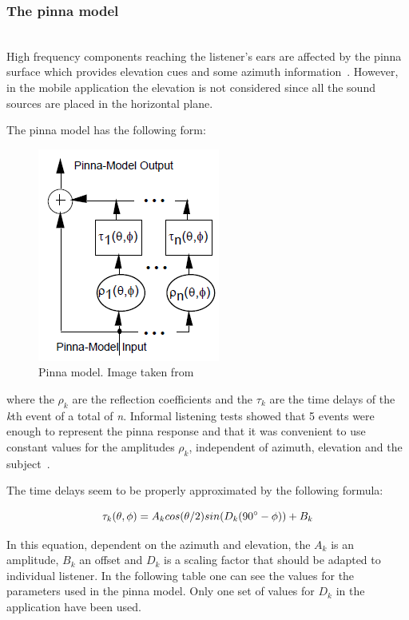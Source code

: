 \documentclass[journal]{IEEEtran}
\begin{document}
\subsubsection{The pinna model}~\\
High frequency components reaching the listener's ears are affected by the pinna surface which provides elevation cues and some azimuth information~\cite{Brown1997}. However, in the mobile application the elevation is not considered since all the sound sources are placed in the horizontal plane. 

The pinna model has the following form:

\begin{figure}[h!]
\centering
\includegraphics[scale=0.75]{graphics/pinna_part.png}
\caption{Pinna model. Image taken from~\cite{Brown1997}}
\label{fig:pinnaModel}
\end{figure}


where the $\rho_{k}$ are the reflection coefficients and the $\tau_{k}$ are the time delays of the \textit{k}th event of a total of \textit{n}. Informal listening tests showed that 5 events were enough to represent the pinna response and that it was convenient to use constant values for the amplitudes $\rho_{k}$, independent of azimuth, elevation and the subject~\cite{Brown1997}. 

The time delays seem to be properly approximated by the following formula:

\begin{equation}\label{eq:pinna}
\tau_{k}(\theta,\phi) = A_{k}cos(\theta/2)sin(D_{k}(90\degree-\phi)) + B_{k}
\end{equation} 

In this equation, dependent on the azimuth and elevation, the $A_{k}$ is an amplitude, $B_{k}$ an offset and $D_{k}$ is a scaling factor that should be adapted to individual listener. 
In the following table one can see the values for the parameters used in the pinna model. Only one set of values for $D_{k}$ in the application have been used.
\end{document}
